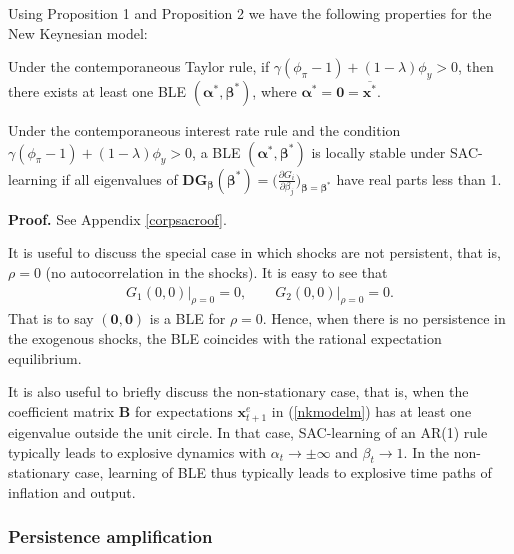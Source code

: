 Using Proposition 1 and Proposition 2 we have the following properties for the New Keynesian model:
\begin{cor}
\label{cor:exis} Under the contemporaneous Taylor rule, if $\gamma(\phi_\pi-1)+(1-\lambda)\phi_y>0$, then there
exists at least one BLE $(\pmb\alpha^*,\pmb\beta^*)$, where
$\pmb\alpha^*=\pmb 0=\overline{\pmb x^*}$.
\end{cor}

\begin{cor}
\label{cor:sac} Under the contemporaneous interest rate rule and the condition $\gamma(\phi_\pi-1)+(1-\lambda)\phi_y>0$, a BLE $(\pmb\alpha^*,{\pmb\beta}^*)$ is locally
stable under SAC-learning if all eigenvalues of $\pmb D\pmb G_{\pmb\beta}(\pmb\beta^*)=\Big(\frac{\partial G_i}{\partial \beta_j}\Big)_{{\pmb\beta}={\pmb\beta}^*}$ have real parts less than 1.
\end{cor}
\textbf{Proof.} See Appendix \ref{corpsacroof}.

It is useful to discuss the special case in which shocks are not persistent, that is, $\rho=0$ (no autocorrelation in the shocks).
It is easy to see that
\begin{eqnarray*}
G_{1}(0,0)\big|_{\rho=0}=0,\quad\quad
G_{2}(0,0)\big|_{\rho=0}=0.
\end{eqnarray*}
That is to say $({\pmb 0}, {\pmb 0})$ is a BLE for $\rho=0$. Hence, when there is no persistence in the exogenous shocks, the BLE coincides with the rational expectation equilibrium.

It is also useful to briefly discuss the non-stationary case, that is, when the coefficient matrix ${\pmb B}$ for expectations ${\pmb x}_{t+1}^e$ in (\ref{nkmodelm}) has at least one eigenvalue outside the unit circle. In that case, SAC-learning of an AR(1) rule typically leads to explosive dynamics with $\alpha_t\to\pm\infty$ and $\beta_t\to 1$. In the non-stationary case, learning of BLE thus typically leads to explosive time paths of inflation and output.

\subsubsection*{Persistence amplification}

